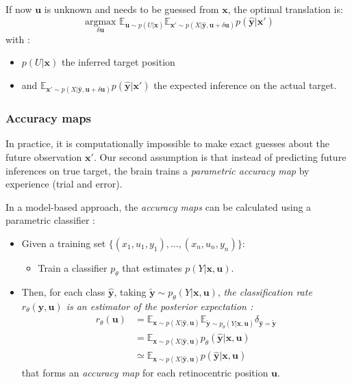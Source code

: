 If now $\boldsymbol{u}$ is unknown and needs to be guessed from $\boldsymbol{x}$, the optimal translation is:
$$\underset{\delta\boldsymbol{u}}{\text{ argmax }} \mathbb{E}_{\boldsymbol{u}\sim p(U|\boldsymbol{x})} \mathbb{E}_{\boldsymbol{x}'\sim p(X|\hat{\boldsymbol{y}}, \boldsymbol{u}+\delta \boldsymbol{u})} p(\hat{\boldsymbol{y}}|\boldsymbol{x}')$$
with :
\begin{itemize}
\item $p(U|\boldsymbol{x})$ the inferred target position
\item and $\mathbb{E}_{\boldsymbol{x}'\sim p(X|\hat{\boldsymbol{y}}, \boldsymbol{u}+\delta \boldsymbol{u})} p(\hat{\boldsymbol{y}}|\boldsymbol{x}')$ the expected inference on the actual target.
\end{itemize}

\subsubsection{Accuracy maps}
 
In practice, it is computationally impossible to make exact guesses about the future observation $\boldsymbol{x}'$. Our second assumption is that instead of predicting future inferences on true target, the brain trains a \emph{parametric accuracy map} by experience (trial and error).


In a model-based approach, the \emph{accuracy maps} can be calculated using a parametric classifier : 
 \begin{itemize}
 \item Given a training set $\{(x_1, u_1, y_1), ..., (x_n, u_n, y_n)\}$:
 \begin{itemize}
 \item Train a classifier $p_\theta$ that estimates $p(Y|\boldsymbol{x}, \boldsymbol{u})$. 
 \end{itemize}
 \item Then, for each class $\hat{\boldsymbol{y}}$, taking $\tilde{\boldsymbol{y}}\sim p_\theta(Y|\boldsymbol{x}, \boldsymbol{u})$,\emph{ the classification rate $r_\theta(\boldsymbol{y}, \boldsymbol{u})$ is an estimator of the posterior expectation :}
 \begin{align*}
 r_\theta(\boldsymbol{u}) 
 &= \mathbb{E}_{ \boldsymbol{x} \sim p(X|\hat{\boldsymbol{y}}, \boldsymbol{u})}
 \mathbb{E}_{\tilde{\boldsymbol{y}}\sim p_\theta(Y|\boldsymbol{x}, \boldsymbol{u})} \delta_{\hat{\boldsymbol{y}}=\tilde{\boldsymbol{y}}}\\
 &= \mathbb{E}_{ \boldsymbol{x} \sim p(X|\hat{\boldsymbol{y}}, \boldsymbol{u})} p_\theta(\hat{\boldsymbol{y}}|\boldsymbol{x}, \boldsymbol{u})\\
 &\simeq \mathbb{E}_{ \boldsymbol{x} \sim p(X|\hat{\boldsymbol{y}}, \boldsymbol{u})} p(\hat{\boldsymbol{y}}|\boldsymbol{x}, \boldsymbol{u})
 \end{align*} 
 that forms an \emph{accuracy map} for each retinocentric position $\boldsymbol{u}$.\\
 \end{itemize}

